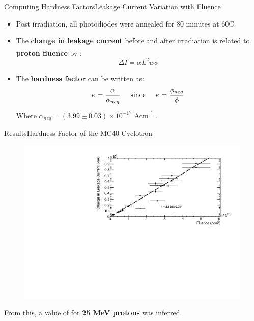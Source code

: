 \documentclass{beamer}
\begin{document}
    \begin{frame}{Computing Hardness Factors}{Leakage Current Variation with Fluence}
        \begin{itemize}
            \item Post irradiation, all photodiodes were annealed for 80 minutes at 60\degree C.
            \item The \textbf{change in leakage current} before and after irradiation is related to \textbf{proton fluence} by \textsuperscript{\cite{Moll}}:
                \begin{equation*}
                    \Delta I = \alpha L^2 w \phi
                \end{equation*}
            \item The \textbf{hardness factor} can be written as:
                \begin{equation*}
                    \kappa = \frac{\alpha}{\alpha _{neq}}\hspace{0.5cm}\text{since}\hspace{0.5cm}\kappa = \frac{\phi _{neq}}{\phi}
                \end{equation*}
                Where $\alpha _{neq} = (3.99 \pm 0.03)\times 10^{-17}$ Acm\textsuperscript{-1} \textsuperscript{\cite{Moll}}.
        \end{itemize}
    \end{frame}
    
    \begin{frame}{Results}{Hardness Factor of the MC40 Cyclotron}
        \begin{figure}
            \centering
            \includegraphics[width = 0.9\linewidth]{MC40_seminar.pdf}
        \end{figure}
    \vspace{-0.3cm}
    From this, a value of  for \textbf{25 MeV protons} was inferred.
    \end{frame}
\end{document}
